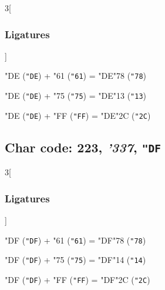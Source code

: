 \documentclass{article}
\newlength{\maxcharwidth}
\begin{document}
\begin{multicols}{3}[\subsubsection{Ligatures}]

{\testfont\char"DE\noboundary} ({\tt"DE}) + {\testfont\char"61\noboundary} ({\tt"61}) = {\testfont\char"DE\noboundary}{\testfont\char"78\noboundary} ({\tt"78}) 

{\testfont\char"DE\noboundary} ({\tt"DE}) + {\testfont\char"75\noboundary} ({\tt"75}) = {\testfont\char"DE\noboundary}{\testfont\char"13\noboundary} ({\tt"13}) 

{\testfont\char"DE\noboundary} ({\tt"DE}) + {\testfont\char"FF\noboundary} ({\tt"FF}) = {\testfont\char"DE\noboundary}{\testfont\char"2C\noboundary} ({\tt"2C}) 

\end{multicols}

\subsection{Char code: 223, {\it'337}, {\tt"DF}}
\label{char_223}


\begin{multicols}{3}[\subsubsection{Ligatures}]

{\testfont\char"DF\noboundary} ({\tt"DF}) + {\testfont\char"61\noboundary} ({\tt"61}) = {\testfont\char"DF\noboundary}{\testfont\char"78\noboundary} ({\tt"78}) 

{\testfont\char"DF\noboundary} ({\tt"DF}) + {\testfont\char"75\noboundary} ({\tt"75}) = {\testfont\char"DF\noboundary}{\testfont\char"14\noboundary} ({\tt"14}) 

{\testfont\char"DF\noboundary} ({\tt"DF}) + {\testfont\char"FF\noboundary} ({\tt"FF}) = {\testfont\char"DF\noboundary}{\testfont\char"2C\noboundary} ({\tt"2C}) 

\end{multicols}
\end{document}
